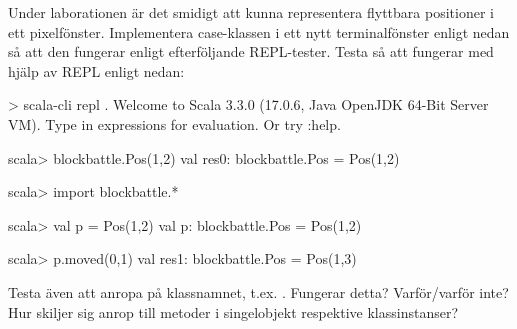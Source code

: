 \Subtask Under laborationen är det smidigt att kunna representera flyttbara positioner i ett pixelfönster. Implementera case-klassen  i ett nytt terminalfönster enligt nedan så att den fungerar enligt efterföljande REPL-tester.
Testa så att  fungerar med hjälp av REPL enligt nedan:
\begin{REPL}
> scala-cli repl .
Welcome to Scala 3.3.0 (17.0.6, Java OpenJDK 64-Bit Server VM).
Type in expressions for evaluation. Or try :help.

scala> blockbattle.Pos(1,2)
val res0: blockbattle.Pos = Pos(1,2)

scala> import blockbattle.*

scala> val p = Pos(1,2)
val p: blockbattle.Pos = Pos(1,2)

scala> p.moved(0,1)
val res1: blockbattle.Pos = Pos(1,3)
\end{REPL}
Testa även att anropa  på klassnamnet, t.ex. . Fungerar detta? Varför/varför inte? Hur skiljer sig anrop till metoder i singelobjekt respektive klassinstanser?

